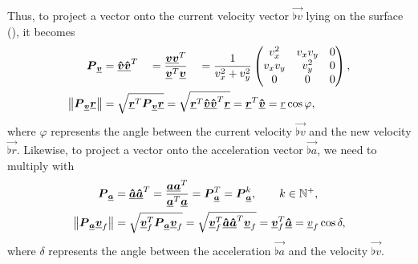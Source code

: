 Thus, to project a vector onto the current velocity vector $\vec{\flat{v}}$ lying on the surface (\greenarea), it becomes
\begin{alignat*}{4}
\projmat{\flat{v}} &= \uvec{\flat{v}} \uvec{\flat{v}}^T &&= \frac{\vec{\flat{v}} \vec{\flat{v}}^T}{\vec{\flat{v}}^T \vec{\flat{v}}} &&= \frac{1}{v_x^2 + v_y^2}
\begin{pmatrix}
v_x^2 & v_x v_y & 0\\
v_x v_y & v_y^2 & 0\\
0 & 0 & 0\\
\end{pmatrix},\\
%
\norm{\projmat{\flat{v}} \vec{\flat{r}}} &= \mathmakebox[0pt][l]{\sqrt{\vec{\flat{r}}^T \projmat{\flat{v}} \vec{\flat{r}}} = \sqrt{\vec{\flat{r}}^T \uvec{\flat{v}} \uvec{\flat{v}}^T \vec{\flat{r}}} = \vec{\flat{r}}^T \uvec{\flat{v}} = \flat{r} \cos\varphi,}
\end{alignat*}
where $\varphi$ represents the angle between the current velocity $\vec{\flat{v}}$ and the new velocity $\vec{\flat{r}}$. Likewise, to project a vector onto the acceleration vector $\vec{\flat{a}}$, we need to multiply with
\begin{align*}
\projmat{\flat{a}} &= \uvec{\flat{a}} \uvec{\flat{a}}^T = \frac{\vec{\flat{a}} \vec{\flat{a}}^T}{\vec{\flat{a}}^T \vec{\flat{a}}} =
\projmat{\flat{a}}^T = \projmat{\flat{a}}^k, \qquad k \in \mathbb{N}^+,\\
%
\norm{\projmat{\flat{a}} \vec{\flat{v}}_f} &= \sqrt{\vec{\flat{v}}_f^T \projmat{\flat{a}} \vec{\flat{v}}_f} = \sqrt{\vec{\flat{v}}_f^T \uvec{\flat{a}} \uvec{\flat{a}}^T \vec{\flat{v}}_f} = \vec{\flat{v}}_f^T \uvec{\flat{a}} = \flat{v}_f \cos\delta,
\end{align*}
where $\delta$ represents the angle between the acceleration $\vec{\flat{a}}$ and the velocity $\vec{\flat{v}}$.
